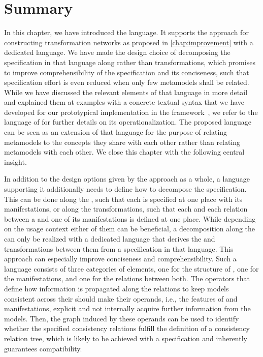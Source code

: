 \section{Summary}

In this chapter, we have introduced the \commonalities language.
It supports the \commonalities approach for constructing transformation networks as proposed in \autoref{chap:improvement} with a dedicated language.
We have made the design choice of decomposing the specification in that language along \commonalities rather than transformations, which promises to improve comprehensibility of the specification and its conciseness, such that specification effort is even reduced when only few metamodels shall be related.
While we have discussed the relevant elements of that language in more detail and explained them at examples with a concrete textual syntax that we have developed for our prototypical implementation in the \vitruv framework~, we refer to the \mappings language of \textcite{kramer2017a} for further details on its operationalization.
The proposed \commonalities language can be seen as an extension of that \mappings language for the purpose of relating metamodels to the concepts they share with each other rather than relating metamodels with each other.
We close this chapter with the following central insight.

\begin{insight}[Language]
    In addition to the design options given by the \commonalities approach as a whole, a language supporting it additionally needs to define how to decompose the specification.
    This can be done along the \commonalities, such that each \commonality is specified at one place with its manifestations, or along the transformations, such that each \conceptmetamodel and each relation between a \conceptmetamodel and one of its manifestations is defined at one place.
    While depending on the usage context either of them can be beneficial, a decomposition along the \commonalities can only be realized with a dedicated language that derives the \conceptmetamodels and transformations between them from a specification in that language. This approach can especially improve conciseness and comprehensibility.
    Such a language consists of three categories of elements, one for the structure of \conceptmetamodels, one for the manifestations, and one for the relations between both.
    The operators that define how information is propagated along the relations to keep models consistent across their \commonalities should make their operands, i.e., the features of \commonalities and manifestations, explicit and not internally acquire further information from the models.
    Then, the graph induced by these operands can be used to identify whether the specified consistency relations fulfill the definition of a consistency relation tree, which is likely to be achieved with a \commonalities specification and inherently guarantees compatibility.
\end{insight}

